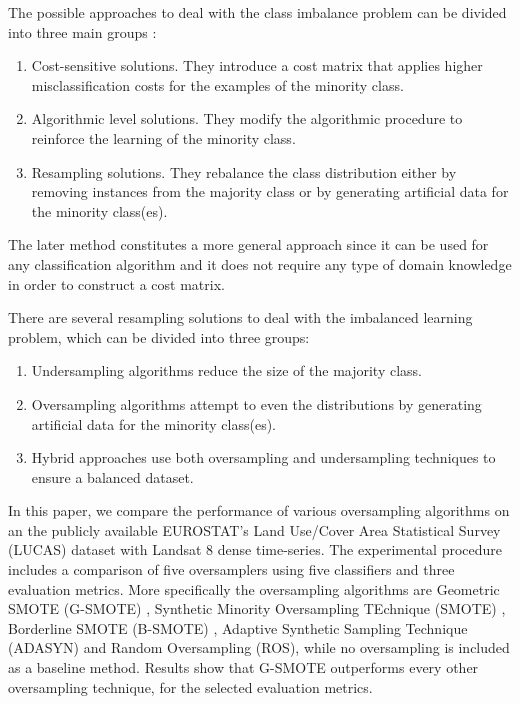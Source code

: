 \documentclass[remotesensing,article,submit,moreauthors,pdftex]{Definitions/mdpi}
\begin{document}
The possible approaches to deal with the class imbalance problem can be divided
into three main groups \cite{Fernandez2013}:

\begin{enumerate}

	\item Cost-sensitive solutions. They introduce a cost matrix that applies
	higher misclassification costs for the examples of the minority class.

	\item Algorithmic level solutions. They modify the algorithmic procedure to
	reinforce the learning of the minority class.

	\item Resampling solutions. They rebalance the class distribution either by
	removing instances from the majority class or by generating artificial data
	for the minority class(es).

\end{enumerate}

The later method constitutes a more general approach since it can be used for
any classification algorithm and it does not require any type of domain
knowledge in order to construct a cost matrix.

There are several resampling solutions to deal with the imbalanced learning
problem, which can be divided into three groups:

\begin{enumerate}

	\item Undersampling algorithms reduce the size of the majority class.

	\item Oversampling algorithms attempt to even the distributions by
	generating artificial data for the minority class(es).

	\item Hybrid approaches use both oversampling and undersampling techniques
	to ensure a balanced dataset.

\end{enumerate}

In this paper, we compare the performance of various oversampling algorithms on
an the publicly available EUROSTAT's Land Use/Cover Area Statistical Survey
(LUCAS) dataset \cite{LUCAS2015} with Landsat 8 dense time-series. The
experimental procedure includes a comparison of five oversamplers using five
classifiers and three evaluation metrics. More specifically the oversampling
algorithms are Geometric SMOTE (G-SMOTE) \cite{Douzas2019}, Synthetic Minority
Oversampling TEchnique (SMOTE) \cite{Chawla2002}, Borderline SMOTE (B-SMOTE)
\cite{Han2005}, Adaptive Synthetic Sampling Technique (ADASYN)
\cite{HaiboHe2008} and Random Oversampling (ROS), while no oversampling is
included as a baseline method. Results show that G-SMOTE outperforms every other
oversampling technique, for the selected evaluation metrics.
\end{document}
